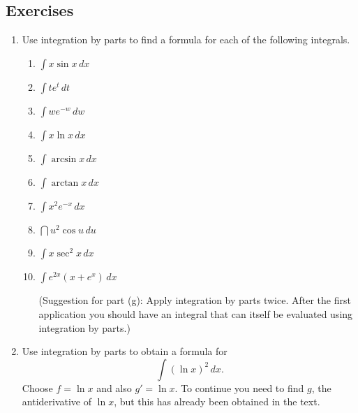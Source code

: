 \subsection{Exercises}
\label{subsec:exercises}




\begin{enumerate}
\item Use integration by parts to find a formula for each of the
following integrals.



  \begin{enumerate}
  \item ${\displaystyle \int x \sin{x}\,dx}$


  \item ${\displaystyle \int te^{t}\,dt}$


  \item ${\displaystyle \int we^{-w}\,dw}$


  \item ${\displaystyle \int x\ln{x}\,dx}$


  \item ${\displaystyle \int \arcsin{x}\,dx}$

  \item ${\displaystyle \int \arctan{x}\,dx}$


  \item ${\displaystyle \int x^2e^{-x}\,dx}$


  \item $\dint u^2 \cos{u} \, du$


  \item ${\displaystyle \int x\sec^2{x}\,dx}$


  \item ${\displaystyle \int e^{2x}(x + e^x)\,dx}$
\mbox{}





(Suggestion for part (g): Apply integration by parts twice.  After the
first application you should have an integral that can itself be
evaluated using integration by parts.)



\end{enumerate}
\item Use integration by parts to obtain a formula for
	\[
\int (\ln{x})^2\,dx.
\]
Choose $f = \ln{x}$ and also $g' = \ln{x}$.  To continue you need to
find $g$, the antiderivative of $\ln{x}$, but this has already been
obtained in the text.




\end{enumerate}
